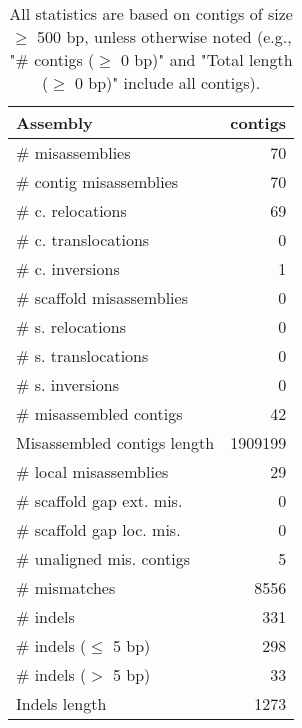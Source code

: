 \documentclass[12pt,a4paper]{article}
\begin{document}
\begin{table}[ht]
\begin{center}
\caption{All statistics are based on contigs of size $\geq$ 500 bp, unless otherwise noted (e.g., "\# contigs ($\geq$ 0 bp)" and "Total length ($\geq$ 0 bp)" include all contigs).}
\begin{tabular}{|l*{1}{|r}|}
\hline
Assembly & contigs \\ \hline
\# misassemblies & 70 \\ \hline
\hspace{2mm}\# contig misassemblies & 70 \\ \hline
\hspace{5mm}\# c. relocations & 69 \\ \hline
\hspace{5mm}\# c. translocations & 0 \\ \hline
\hspace{5mm}\# c. inversions & 1 \\ \hline
\hspace{2mm}\# scaffold misassemblies & 0 \\ \hline
\hspace{5mm}\# s. relocations & 0 \\ \hline
\hspace{5mm}\# s. translocations & 0 \\ \hline
\hspace{5mm}\# s. inversions & 0 \\ \hline
\# misassembled contigs & 42 \\ \hline
Misassembled contigs length & 1909199 \\ \hline
\# local misassemblies & 29 \\ \hline
\# scaffold gap ext. mis. & 0 \\ \hline
\# scaffold gap loc. mis. & 0 \\ \hline
\# unaligned mis. contigs & 5 \\ \hline
\# mismatches & 8556 \\ \hline
\# indels & 331 \\ \hline
\hspace{5mm}\# indels ($\leq$ 5 bp) & 298 \\ \hline
\hspace{5mm}\# indels ($>$ 5 bp) & 33 \\ \hline
Indels length & 1273 \\ \hline
\end{tabular}
\end{center}
\end{table}
\end{document}
